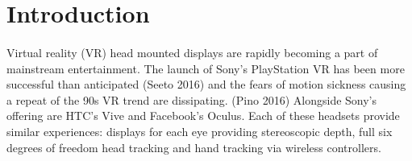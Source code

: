 \documentclass[11pt]{article}
\begin{document}
\section{Introduction}

\paragraph{}
Virtual reality (VR) head mounted displays are rapidly becoming a part of mainstream entertainment. The launch of Sony's PlayStation VR has been more successful than anticipated (Seeto 2016) and the fears of motion sickness causing a repeat of the 90s VR trend are dissipating. (Pino 2016) Alongside Sony's offering are HTC's Vive and Facebook's Oculus. Each of these headsets provide similar experiences: displays for each eye providing stereoscopic depth, full six degrees of freedom head tracking and hand tracking via wireless controllers.
\end{document}
